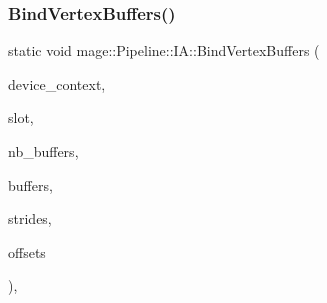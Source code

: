 \hypertarget{structmage_1_1_pipeline_1_1_i_a_a1c9c3a65014815a94a5c4f69809201b9}{}\label{structmage_1_1_pipeline_1_1_i_a_a1c9c3a65014815a94a5c4f69809201b9} 
\subsubsection{\texorpdfstring{Bind\+Vertex\+Buffers()}{BindVertexBuffers()}}
{\footnotesize\ttfamily static void mage\+::\+Pipeline\+::\+I\+A\+::\+Bind\+Vertex\+Buffers (\begin{DoxyParamCaption}\item[{I\+D3\+D11\+Device\+Context4 $\ast$}]{device\+\_\+context,  }\item[{\hyperlink{namespacemage_a41c104c036fba3756a74e19f793eeaa1}{U32}}]{slot,  }\item[{\hyperlink{namespacemage_a41c104c036fba3756a74e19f793eeaa1}{U32}}]{nb\+\_\+buffers,  }\item[{I\+D3\+D11\+Buffer $\ast$const $\ast$}]{buffers,  }\item[{const \hyperlink{namespacemage_a41c104c036fba3756a74e19f793eeaa1}{U32} $\ast$}]{strides,  }\item[{const \hyperlink{namespacemage_a41c104c036fba3756a74e19f793eeaa1}{U32} $\ast$}]{offsets }\end{DoxyParamCaption})\hspace{0.3cm}{\ttfamily [static]}, {\ttfamily [noexcept]}}

